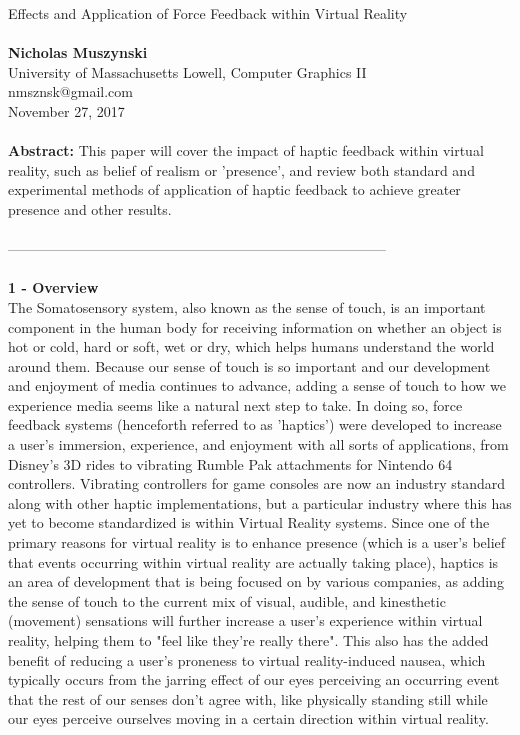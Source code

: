 \documentclass{article}
\begin{document}
\noindent
\Huge
\sloppy
Effects and Application of Force Feedback within Virtual Reality \\ \\
\normalsize
\textbf{Nicholas Muszynski} \\
University of Massachusetts Lowell, Computer Graphics II \\
nmsznsk@gmail.com \\
November 27, 2017 \\ \\

\noindent
\textbf{Abstract:} This paper will cover the impact of haptic feedback within virtual reality, such as belief of realism or 'presence', and review both standard and experimental methods of application of haptic feedback to achieve greater presence and other results. \\ \\
--------------------------------------------------------------------------------- \\ \\

\textbf{1 - Overview} \\
The Somatosensory system, also known as the sense of touch, is an important component in the human body for receiving information on whether  an object is hot or cold, hard or soft, wet or dry, which helps humans understand the world around them. Because our sense of touch is so important and our development and enjoyment of media continues to advance, adding a sense of touch to how we experience media seems like a natural next step to take. In doing so, force feedback systems (henceforth referred to as 'haptics') were developed to increase a user's immersion, experience, and enjoyment with all sorts of applications, from Disney's 3D rides to vibrating Rumble Pak attachments for Nintendo 64 controllers. Vibrating controllers for game consoles are now an industry standard along with other haptic implementations, but a particular industry where this has yet to become standardized is within Virtual Reality systems. Since one of the primary reasons for virtual reality is to enhance presence (which is a user's belief that events occurring within virtual reality are actually taking place), haptics is an area of development that is being focused on by various companies, as adding the sense of touch to the current mix of visual, audible, and kinesthetic (movement) sensations will further increase a user's experience within virtual reality, helping them to "feel like they're really there". This also has the added benefit of reducing a user's proneness to virtual reality-induced nausea, which typically occurs from the jarring effect of our eyes perceiving an occurring event that the rest of our senses don't agree with, like physically standing still while our eyes perceive ourselves moving in a certain direction within virtual reality. \\ \\
\end{document}
